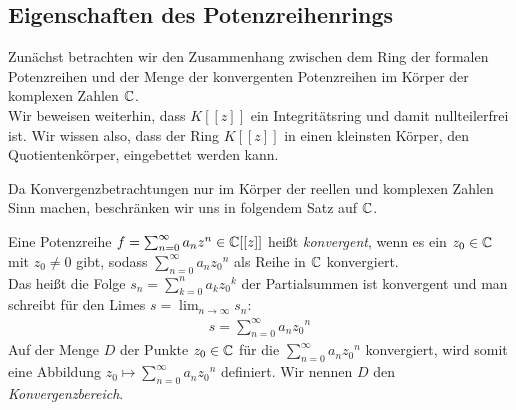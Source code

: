 \subsection{Eigenschaften des Potenzreihenrings}
Zunächst betrachten wir den Zusammenhang zwischen dem Ring der formalen Potenzreihen und der Menge der konvergenten Potenzreihen im Körper der komplexen Zahlen $\mathbb{C}$. \\
Wir beweisen weiterhin, dass $K[[z]]$ ein Integritätsring und damit nullteilerfrei ist. Wir wissen also, dass der Ring $K[[z]]$ in einen kleinsten Körper, den Quotientenkörper, eingebettet werden kann.
%

Da Konvergenzbetrachtungen nur im Körper der reellen und komplexen Zahlen Sinn machen, beschränken wir uns in folgendem Satz auf $\mathbb{C}$.  
%
%
\begin{defn}\label{konvergenz}
Eine Potenzreihe $f = \sum_{n= 0}^{\infty}a_nz^n \in \mathbb{C}[[z]]$ heißt \textit{konvergent}, wenn es ein $z_0\in \mathbb{C}$ mit $z_0 \neq 0$ gibt, sodass $\sum_{n=0}^{\infty}a_n{z_0}^n$ als Reihe in $\mathbb{C}$ konvergiert. \\
Das heißt die Folge $s_n = \sum_{k=0}^{n}a_k{z_0}^k$ der Partialsummen ist konvergent und man schreibt für den Limes $s = \lim_{n \to \infty}s_n$:
\begin{align}
s= \sum_{n=0}^{\infty}a_n{z_0}^n
\end{align}
Auf der Menge $D$ der Punkte $z_0 \in \mathbb{C}$ für die $\sum_{n=0}^{\infty}a_n{z_0}^n$ konvergiert, wird somit eine Abbildung $z_0 \mapsto \sum_{n=0}^{\infty}a_n{z_0}^n $ definiert. Wir nennen $D$ den \textit{Konvergenzbereich}.
\end{defn}


